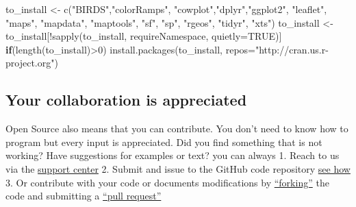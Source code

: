\documentclass[
  10pt,
]{article}
\newenvironment{Shaded}{\begin{snugshade}}{\end{snugshade}}
\newcommand{\AttributeTok}[1]{\textcolor[rgb]{0.77,0.63,0.00}{#1}}
\newcommand{\ConstantTok}[1]{\textcolor[rgb]{0.00,0.00,0.00}{#1}}
\newcommand{\ControlFlowTok}[1]{\textcolor[rgb]{0.13,0.29,0.53}{\textbf{#1}}}
\newcommand{\DecValTok}[1]{\textcolor[rgb]{0.00,0.00,0.81}{#1}}
\newcommand{\FunctionTok}[1]{\textcolor[rgb]{0.00,0.00,0.00}{#1}}
\newcommand{\NormalTok}[1]{#1}
\newcommand{\OtherTok}[1]{\textcolor[rgb]{0.56,0.35,0.01}{#1}}
\newcommand{\SpecialCharTok}[1]{\textcolor[rgb]{0.00,0.00,0.00}{#1}}
\newcommand{\StringTok}[1]{\textcolor[rgb]{0.31,0.60,0.02}{#1}}
\begin{document}
\begin{Shaded}
\begin{Highlighting}[]
\NormalTok{to\_install }\OtherTok{\textless{}{-}} \FunctionTok{c}\NormalTok{(}\StringTok{"BIRDS"}\NormalTok{,}\StringTok{"colorRamps"}\NormalTok{, }\StringTok{"cowplot"}\NormalTok{,}\StringTok{"dplyr"}\NormalTok{,}\StringTok{"ggplot2"}\NormalTok{, }\StringTok{"leaflet"}\NormalTok{,}
                \StringTok{"maps"}\NormalTok{, }\StringTok{"mapdata"}\NormalTok{, }\StringTok{"maptools"}\NormalTok{, }\StringTok{"sf"}\NormalTok{, }\StringTok{"sp"}\NormalTok{, }\StringTok{"rgeos"}\NormalTok{, }\StringTok{"tidyr"}\NormalTok{, }\StringTok{"xts"}\NormalTok{)}
\NormalTok{to\_install }\OtherTok{\textless{}{-}}\NormalTok{ to\_install[}\SpecialCharTok{!}\FunctionTok{sapply}\NormalTok{(to\_install, requireNamespace, }\AttributeTok{quietly=}\ConstantTok{TRUE}\NormalTok{)]}
\ControlFlowTok{if}\NormalTok{(}\FunctionTok{length}\NormalTok{(to\_install)}\SpecialCharTok{\textgreater{}}\DecValTok{0}\NormalTok{)}
    \FunctionTok{install.packages}\NormalTok{(to\_install, }\AttributeTok{repos=}\StringTok{"http://cran.us.r{-}project.org"}\NormalTok{)}
\end{Highlighting}
\end{Shaded}

\hypertarget{your-collaboration-is-appreciated}{%
\subsection*{Your collaboration is appreciated}\label{your-collaboration-is-appreciated}}

Open Source also means that you can contribute. You don't need to know how to program
but every input is appreciated. Did you find something that is not working?
Have suggestions for examples or text? you can always
1. Reach to us via the \href{https://docs.biodiversitydata.se/support/}{support center}
2. Submit and issue to the GitHub code repository \href{https://docs.github.com/en/github/managing-your-work-on-github/managing-your-work-with-issues-and-pull-requests/creating-an-issue}{see how}
3. Or contribute with your code or documents modifications by \href{https://docs.github.com/en/github/getting-started-with-github/quickstart/fork-a-repo}{``forking''}
the code and submitting a \href{https://docs.github.com/en/github/collaborating-with-issues-and-pull-requests/proposing-changes-to-your-work-with-pull-requests/creating-a-pull-request-from-a-fork}{``pull request''}
\end{document}
